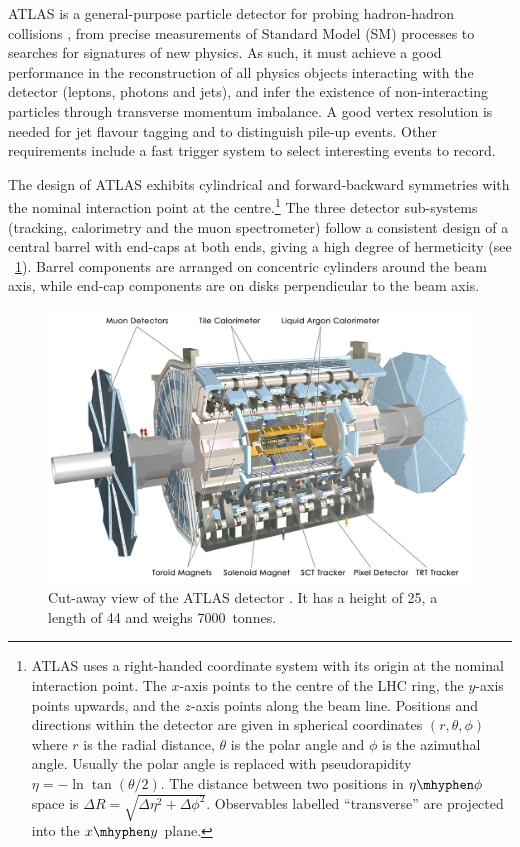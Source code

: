 
ATLAS is a general-purpose particle detector for probing hadron-hadron collisions 
\cite{ATLAS-detector}, from precise measurements of Standard Model (SM) processes to 
searches for signatures of new physics. As such, it must achieve a good performance in 
the reconstruction of all physics objects interacting with the detector (leptons, photons 
and jets), and infer the existence of non-interacting particles through transverse 
momentum imbalance. A good vertex resolution is needed for jet flavour tagging and to 
distinguish pile-up events. Other requirements include a fast trigger system to select 
interesting events to record.

The design of ATLAS exhibits cylindrical and forward-backward symmetries with the nominal 
interaction point at the centre.\footnote{
	ATLAS uses a right-handed coordinate system with its origin at the nominal 
	interaction point. The $x$-axis points to the centre of the LHC ring, the 
	$y$-axis points upwards, and the $z$-axis points along the beam line. Positions and 
	directions within the detector are given in spherical coordinates $(r, \theta, \phi)$ 
	where $r$ is the radial distance, $\theta$ is the polar angle and $\phi$ is the 
	azimuthal angle. Usually the polar angle is replaced with pseudorapidity 
	$\eta = -\ln\tan(\theta/2)$. The distance between two positions in $\eta\mhyphen\phi$ 
	space is $\Delta R = \sqrt{\Delta\eta^2 + \Delta\phi^2}$.
	Observables labelled ``transverse'' are projected into the $x\mhyphen y$ plane.
} 
The three detector sub-systems (tracking, calorimetry and the muon spectrometer) 
follow a consistent design of a central barrel with end-caps at both ends, giving a high 
degree of hermeticity (see \Figure~\ref{fig:atlas_whole}). Barrel components are arranged 
on concentric cylinders around the beam axis, while end-cap components are on disks 
perpendicular to the beam axis.

\begin{figure}[t]
	\includegraphics[width=\hugefigwidth]{tex/experiment/atlas_whole}
	\caption{Cut-away view of the ATLAS detector \cite{ATLAS-detector}. It has a height 
	of \unit{25}{\metre}, a length of \unit{44}{\metre} and weighs 7000~tonnes.}
	\label{fig:atlas_whole}
\end{figure}

